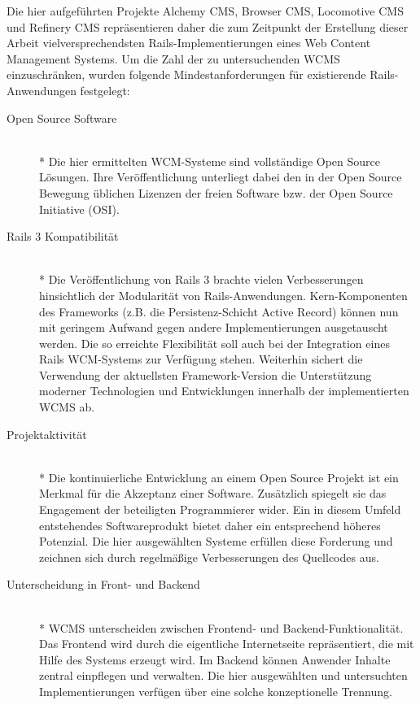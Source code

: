 Die hier aufgeführten Projekte Alchemy CMS, Browser CMS, Locomotive CMS und Refinery CMS repräsentieren daher die zum Zeitpunkt der Erstellung dieser Arbeit vielversprechendsten Rails-Implementierungen eines Web Content Management Systems. \newline
\newline
Um die Zahl der zu untersuchenden WCMS einzuschränken, wurden folgende Mindestanforderungen für existierende Rails-Anwendungen festgelegt:
\begin{description}
\item[Open Source Software]\mbox{~}\\*
Die hier ermittelten WCM-Systeme sind vollständige Open Source Lösungen. Ihre Veröffentlichung unterliegt dabei den in der Open Source Bewegung üblichen Lizenzen der freien Software bzw. der Open Source Initiative (OSI).
\item[Rails 3 Kompatibilität]\mbox{~}\\*
Die Veröffentlichung von Rails 3 brachte vielen Verbesserungen hinsichtlich der Modularität von Rails-Anwendungen. Kern-Komponenten des Frameworks (z.B. die Persistenz-Schicht Active Record) können nun mit geringem Aufwand gegen andere Implementierungen ausgetauscht werden. Die so erreichte Flexibilität soll auch bei der Integration eines Rails WCM-Systems zur Verfügung stehen.	Weiterhin sichert die Verwendung der aktuellsten Framework-Version die 	Unterstützung moderner Technologien und Entwicklungen innerhalb der implementierten WCMS ab.
\item[Projektaktivität]\mbox{~}\\*
Die kontinuierliche Entwicklung an einem Open Source Projekt ist ein Merkmal für die Akzeptanz einer Software. Zusätzlich spiegelt sie das Engagement der beteiligten Programmierer wider. Ein in diesem Umfeld entstehendes Softwareprodukt bietet daher ein entsprechend höheres Potenzial. Die hier ausgewählten Systeme erfüllen diese Forderung und zeichnen sich durch regelmäßige Verbesserungen des Quellcodes aus.
\newpage
\item[Unterscheidung in Front- und Backend]\mbox{~}\\*
WCMS unterscheiden zwischen Frontend- und Backend-Funktionalität. Das Frontend wird durch die eigentliche Internetseite repräsentiert, die mit Hilfe des Systems erzeugt wird. Im Backend können Anwender Inhalte zentral einpflegen und verwalten. Die hier ausgewählten und untersuchten Implementierungen verfügen über eine solche konzeptionelle Trennung.
\end{description}

